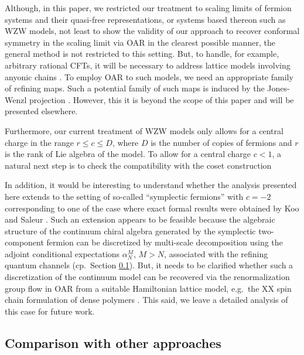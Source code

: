 \documentclass[a4paper, 11pt]{article}
\DeclareMathOperator{\1}{\mathds{1}}
\begin{document}
\bigskip

Although, in this paper, we restricted our treatment to scaling limits of fermion systems and their quasi-free representations, or systems based thereon such as WZW models, not least to show the validity of our approach to recover conformal symmetry in the scaling limit via OAR in the clearest possible manner, the general method is not restricted to this setting. But, to handle, for example, arbitrary rational CFTs, it will be necessary to address lattice models involving anyonic chains \cite{FeiguinInteractingAnyonsIn, ZiniConformalFieldTheories}. To employ OAR to such models, we need an appropriate family of refining maps. Such a potential family of such maps is induced by the Jones-Wenzl projection \cite{WenzlOnSequencesOf, KauffmanTemperleyLiebRecoupling}. However, this it is beyond the scope of this paper and will be presented elsewhere.

Furthermore, our current treatment of WZW models only allows for a central charge in the range $r\leq c\leq D$, where $D$ is the number of copies of fermions and $r$ is the rank of Lie algebra of the model. To allow for a central charge $c<1$, a natural next step is to check the compatibility with the coset construction \cite{GoddardSymmetricSpacesSugawara, GoddardUnitaryRepresentationsOf}

In addition, it would be interesting to understand whether the analysis presented here extends to the setting of so-called ``symplectic fermions'' \cite{SaleurPolymersAndPercolation, KauschSymplecticFermions, GaberdielALocalLogarithmic} with $c=-2$ corresponding to one of the case where exact formal results were obtained by Koo and Saleur \cite{KooRepresentationsOfThe}. Such an extension appears to be feasible because the algebraic structure of the continuum chiral algebra generated by the symplectic two-component fermion can be discretized by multi-scale decomposition using the adjoint conditional expectations $\alpha^{M}_{N}$, $M>N$, associated with the refining quantum channels (cp.~Section \ref{sec:comp}). But, it needs to be clarified whether such a discretization of the continuum model can be recovered via the renormalization group flow in OAR from a suitable Hamiltonian lattice model, e.g.~the XX spin chain formulation of dense polymers \cite{SaleurPolymersAndPercolation}. This said, we leave a detailed analysis of this case for future work.

\subsection{Comparison with other approaches}
\label{sec:comp}
\end{document}
